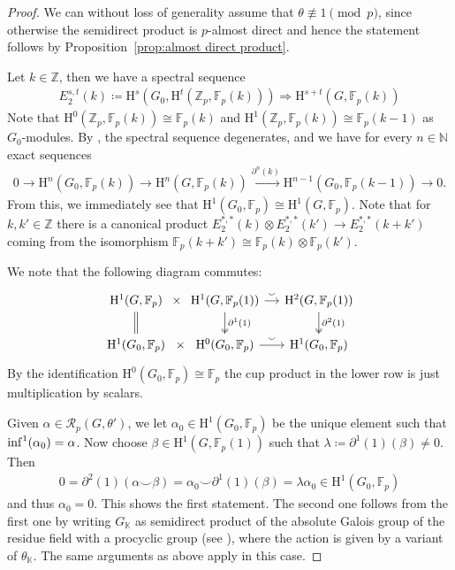 \documentclass{amsart}
\theoremstyle{definition}
\theoremstyle{remark}
\newcommand{\KK}{\mathbb{K}}
\newcommand{\ZZ}{\mathbb{Z}}
\newcommand{\NN}{\mathbb{N}}
\newcommand{\FF}{\mathbb{F}}
\newcommand{\calR}{\mathcal{R}}
\newcommand{\rmH}{\mathrm H}%
\begin{document}
\begin{proof}
    We can without loss of generality assume that $\theta\not\equiv 1\pmod p$, since otherwise the semidirect product is $p$-almost direct and hence the statement follows by Proposition~\ref{prop:almost direct product}.

    Let $k\in \ZZ$, then we have a spectral sequence 
    \begin{align*}
        E^{s,t}_2(k)\coloneq \rmH^s(G_0,\rmH^t(\ZZ_p,\FF_p(k)))\Longrightarrow \rmH^{s+t}(G,\FF_p(k))
    \end{align*}
    Note that $\rmH^0(\ZZ_p,\FF_p(k))\cong \FF_p(k)$ and $\rmH^1(\ZZ_p,\FF_p(k))\cong \FF_p(k-1)$ as $G_0$-modules. By \cite[Prop. 2.4.5]{NSW2008}, the spectral sequence degenerates, and we have for every $n\in \NN$ exact sequences
    \begin{align*}
        0\to \rmH^n(G_0,\FF_p(k))\to \rmH^n(G,\FF_p(k))\overset{\partial^n(k)}\to \rmH^{n-1}(G_0,\FF_p(k-1))\to 0.
    \end{align*}
    From this, we immediately see that $\rmH^1(G_0,\FF_p)\cong \rmH^1(G,\FF_p)$. Note that for $k,k'\in \ZZ$ there is a canonical product $E^{*,*}_2(k)\otimes E_2^{*,*}(k')\to E^{*,*
    }_2(k+k')$ coming from the isomorphism $\FF_p(k+k')\cong \FF_p(k)\otimes \FF_p(k')$.

    We note that the following diagram commutes:
    \begin{equation*}
        \begin{tikzcd}[column sep=small]
            \rmH^1(G,\FF_p)\arrow[r,phantom,"\times"]&\rmH^1(G,\FF_p(1))\arrow[d,two heads, "\partial^1(1)"] \arrow[r,"\smallsmile"] &\rmH^2(G,\FF_p(1))\arrow[d,two heads,"\partial^2(1)"]\\
            \rmH^1(G_0,\FF_p)\arrow[u,equal]\arrow[r,phantom,"\times"]&\rmH^0(G_0,\FF_p)\arrow[r,"\smallsmile"]&\rmH^1(G_0,\FF_p)
        \end{tikzcd}
    \end{equation*}
    By the identification $\rmH^0(G_0,\FF_p)\cong \FF_p$ the cup product in the lower row is just multiplication by scalars.
    
    Given $\alpha\in \calR_p(G,\theta')$, we let $\alpha_0\in \rmH^1(G_0,\FF_p)$ be the unique element such that $\smash{\inf^1}(\alpha_0)=\alpha$. Now choose $\beta\in \rmH^1(G,\FF_p(1))$ such that $\lambda\coloneq \partial^1(1)(\beta)\neq 0$. Then 
    \begin{align*}
        0=\partial^2(1)(\alpha \smallsmile\beta)=\alpha_0\smallsmile \partial^1(1)(\beta)=\lambda \alpha_0\in \rmH^1(G_0,\FF_p)
    \end{align*}
    and thus $\alpha_0=0$. This shows the first statement. The second one follows from the first one by writing $G_\KK$ as semidirect product of the absolute Galois group of the residue field with a procyclic group (see \cite[Exercises II \S4]{serre:galc}), where the action is given by a variant of $\theta_\KK$. The same arguments as above apply in this case.
\end{proof}
\end{document}
